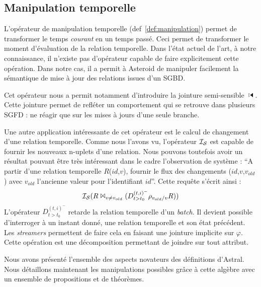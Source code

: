 \subsection{Manipulation temporelle}
L'opérateur de manipulation temporelle (def~\ref{def:manipulation}) permet de transformer le temps \textit{courant} en un temps passé. Ceci permet de transformer le moment d'évaluation de la relation temporelle. Dans l'état actuel de l'art, à notre connaissance, il n'existe pas d'opérateur capable de faire explicitement cette opération. Dans notre cas, il a permit à Asteroid de manipuler facilement la sémantique de mise à jour des relations issues d'un SGBD.

Cet opérateur nous a permit notamment d'introduire la jointure semi-sensible $\ssjoin$. Cette jointure permet de refléter un comportement qui se retrouve dans plusieurs SGFD : ne réagir que sur les mises à jours d'une seule branche.

Une autre application intéressante de cet opérateur est le calcul de changement d'une relation temporelle. Comme nous l'avons vu, l'opérateur $\mathcal{I_S}$ est capable de fournir les nouveaux n-uplets d'une relation. Nous pouvons toutefois avoir un résultat pouvant être très intéressant dans le cadre l'observation de système : \enquote{A partir d'une relation temporelle $R$($id$,$v$), fournir le flux des changements ($id$,$v$,$v_{old}$) avec $v_{old}$ l'ancienne valeur pour l'identifiant $id$}. Cette requête s'écrit ainsi :
$$\mathcal{I_S}(R \Join_{v\neq v_{old}} (D^{(t,i)^-}_{t>t_0}\rho_{v_{old}/v} R))$$
L'opérateur $D^{(t,i)^-}_{t>t_0}$ retarde la relation temporelle d'un \textit{batch}. Il devient possible d'interroger à un instant donné, une relation temporelle et son état précédent. Les \textit{streamers} permettent de faire cela en faisant une jointure implicite sur $\varphi$. Cette opération est une décomposition permettant de joindre sur tout attribut.

Nous avons présenté l'ensemble des aspects novateurs des définitions d'Astral. Nous détaillons maintenant les manipulations possibles grâce à cette algèbre avec un ensemble de propositions et de théorèmes.